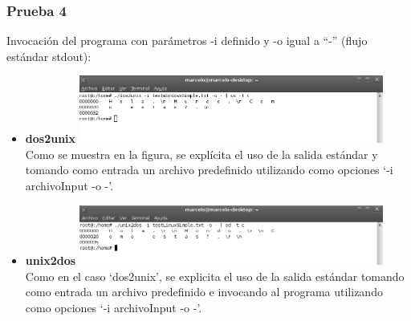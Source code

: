 \documentclass[a4paper,10pt]{article}
\begin{document}
    \subsubsection{Prueba 4}
    Invocaci\'on del programa con par\'ametros -i definido y -o igual a ``-'' (flujo est\'andar stdout):
      \begin{itemize}
      \item \textbf{dos2unix}
      \newline
      \includegraphics[width=10cm, viewport=0 0 897 199]{../Informe/Imagenes/prueba4-invocacion-dos2unix.png}
      \newline	
      Como se muestra en la figura, se expl\'icita el uso de la salida est\'andar y tomando como entrada un archivo predefinido utilizando como opciones 
      `-i archivoInput -o -'.
      \item \textbf{unix2dos}
      \newline
      \includegraphics[width=10cm, viewport=0 0 898 177]{../Informe/Imagenes/prueba4-invocacion-unix2dos.png}	
      \newline
      Como en el caso `dos2unix', se explicita el uso de la salida est\'andar tomando como entrada un archivo predefinido e invocando al programa
      utilizando como opciones `-i archivoInput -o -'.
      
      \end{itemize}
\end{document}
